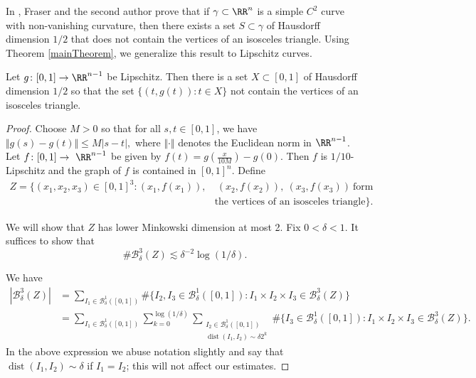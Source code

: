 In \cite{MalabikaRob}, Fraser and the second author prove that if $\gamma\subset\RR^n$ is a simple $C^2$ curve with non-vanishing curvature, then there exists a set $S\subset\gamma$ of Hausdorff dimension $1/2$ that does not contain the vertices of an isosceles triangle. Using Theorem \ref{mainTheorem}, we generalize this result to Lipschitz curves. 

\begin{theorem}\label{C1IsoscelesThm}
Let $g\colon [0,1]\to \RR^{n-1}$ be Lipschitz. Then there is a set $X\subset [0,1]$ of Hausdorff dimension $1/2$ so that the set $\{(t,g(t))\colon t\in X\}$ not contain the vertices of an isosceles triangle.
\end{theorem}

\begin{proof}
Choose $M>0$ so that for all $s,t\in [0,1]$, we have $\Vert g(s)-g(t)\Vert \leq M|s-t|,$ where $\Vert \cdot \Vert$ denotes the Euclidean norm in $\RR^{n-1}$. Let $f\colon[0,1]\to\ \RR^{n-1}$ be given by $f(t) = g(\frac{x}{10M})-g(0)$. Then $f$ is $1/10$-Lipschitz and the graph of $f$ is contained in $[0,1]^n$. Define
\begin{align*}
Z=\{(x_1,x_2,x_3)\in [0,1]^3\colon (x_1,f(x_1)),&\ (x_2,f(x_2)),\ (x_3,f(x_3))\ \textrm{form}\\
&\textrm{the vertices of an isosceles triangle}\}.
\end{align*}

We will show that $Z$ has lower Minkowski dimension at most 2. Fix $0<\delta<1$. It suffices to show that
\begin{equation}\label{deltaCoveringZ}
\# \mathcal{B}_{\delta}^{3}(Z)\lesssim\delta^{-2}\log(1/\delta).
\end{equation}

We have
\begin{align*}
|\mathcal{B}_{\delta}^{3}(Z)| &= \sum_{I_1 \in \mathcal{B}_{\delta}^1([0,1])} \#\{ I_2,I_3\in \mathcal{B}_{\delta}^1([0,1])\colon I_1\times I_2\times I_3\in \mathcal{B}_{\delta}^{3}(Z) \}\\
&= \sum_{I_1 \in \mathcal{B}_{\delta}^1([0,1])} \sum_{k=0}^{\log(1/\delta)} \sum_{\substack{I_2 \in \mathcal{B}_{\delta}^1([0,1]) \\ \operatorname{dist}(I_1,I_2)\sim \delta 2^k }} \#\{ I_3\in \mathcal{B}_{\delta}^1([0,1])\colon  I_1\times I_2\times I_3\in \mathcal{B}_{\delta}^{3}(Z) \}.
\end{align*}
In the above expression we abuse notation slightly and say that $\operatorname{dist}(I_1,I_2)\sim \delta$ if $I_1=I_2$; this will not affect our estimates.


\end{proof}
